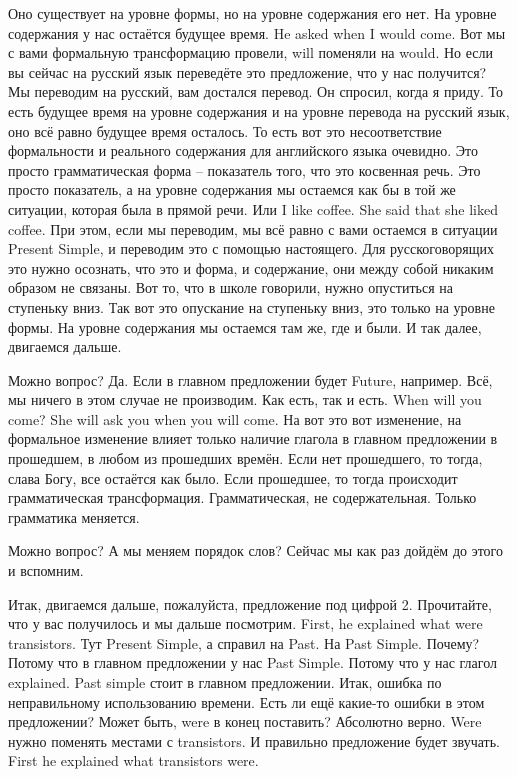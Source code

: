 \documentclass[main.tex]{subfiles}
\begin{document}
Оно существует на уровне формы, но на уровне содержания его нет.
На уровне содержания у нас остаётся будущее время.
He asked when I would come.
Вот мы с вами формальную трансформацию провели, will поменяли на would.
Но если вы сейчас на русский язык переведёте это предложение, что у нас получится?
Мы переводим на русский, вам достался перевод.
Он спросил, когда я приду.
То есть будущее время на уровне содержания и на уровне перевода на русский язык, оно всё равно будущее время осталось.
То есть вот это несоответствие формальности и реального содержания для английского языка очевидно.
Это просто грамматическая форма -- показатель того, что это косвенная речь.
Это просто показатель, а на уровне содержания мы остаемся как бы в той же ситуации, которая была в прямой речи.
Или I like coffee.
She said that she liked coffee.
При этом, если мы переводим, мы всё равно с вами остаемся в ситуации Present Simple, и переводим это с помощью настоящего.
Для русскоговорящих это нужно осознать, что это и форма, и содержание, они между собой никаким образом не связаны.
Вот то, что в школе говорили, нужно опуститься на ступеньку вниз.
Так вот это опускание на ступеньку вниз, это только на уровне формы.
На уровне содержания мы остаемся там же, где и были.
И так далее, двигаемся дальше.

Можно вопрос? Да.
Если в главном предложении будет Future, например.
Всё, мы ничего в этом случае не производим.
Как есть, так и есть.
When will you come?
She will ask you when you will come.
На вот это вот изменение, на формальное изменение влияет только наличие глагола в главном предложении в прошедшем, в любом из прошедших времён.
Если нет прошедшего, то тогда, слава Богу, все остаётся как было.
Если прошедшее, то тогда происходит грамматическая трансформация.
Грамматическая, не содержательная.
Только грамматика меняется.

Можно вопрос?
А мы меняем порядок слов?
Сейчас мы как раз дойдём до этого и вспомним.

Итак, двигаемся дальше, пожалуйста, предложение под цифрой 2.
Прочитайте, что у вас получилось и мы дальше посмотрим.
First, he explained what were transistors.
Тут Present Simple, а справил на Past.
На Past Simple.
Почему?
Потому что в главном предложении у нас Past Simple.
Потому что у нас глагол explained.
Past simple стоит в главном предложении.
Итак, ошибка по неправильному использованию времени.
Есть ли ещё какие-то ошибки в этом предложении?
Может быть, were в конец поставить?
Абсолютно верно.
Were нужно поменять местами с transistors.
И правильно предложение будет звучать.
First he explained what transistors were.
\end{document}
